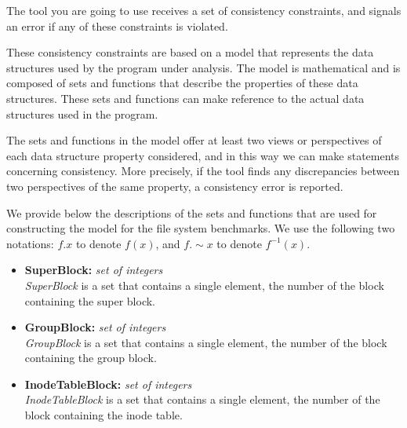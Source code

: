 \documentclass{article}
\title{}
\author{Consistency constraints}
\date{July 30, 2003}
\begin{document}
\maketitle
\begin{flushleft}
\thispagestyle{empty}

\vspace{0.5in}


The tool you are going to use receives a set of consistency constraints,
and signals an error if any of these constraints is violated.

\vspace{0.1in}
These consistency constraints are based on a model that represents the 
data structures used by the program under analysis.  The model is mathematical 
and is composed of sets and functions that describe the properties of these 
data structures.  These sets and functions can make reference to the actual
data structures used in the program.

\vspace{0.1in}
The sets and functions in the model offer at least two views or perspectives 
of each data structure property considered, and in this way we can make 
statements concerning consistency. More precisely, if the tool finds any 
discrepancies between two perspectives of the same property, a consistency 
error is reported. 

\vspace{0.2in}
We provide below the descriptions of the sets and functions that are used for 
constructing the model for the file system benchmarks. We use the following
two notations: $f.x$ to denote $f(x)$, and $f.\sim x$ to denote $f^{-1}(x)$.

\begin{itemize}
  \item{{\bf SuperBlock:} {\it set of integers} 
   \\ {\it SuperBlock} is a set that contains a single element, the number of 
the block containing the super block.}

  \item{{\bf GroupBlock:} {\it set of integers}
   \\ {\it GroupBlock} is a set that contains a single element, the number of 
the block containing the group block.}

  \item{{\bf InodeTableBlock:} {\it set of integers} 
  \\ {\it InodeTableBlock} is a set that contains a single element, the number 
of the block containing the inode table.}


\end{itemize}
\end{flushleft}
\end{document}
